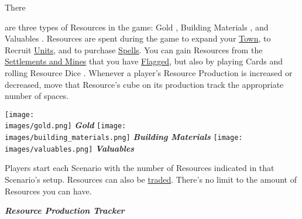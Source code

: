 
\begin{multicols}{2}

\hypertarget{Resources}{There} are three types of Resources in the game: Gold , Building Materials , and Valuables .
Resources are spent during the game to expand your \hyperlink{Town}{Town}, to Recruit \hyperlink{Units}{Units}, and to purchase \hyperlink{spells}{Spells}.
You can gain Resources from the \hyperlink{Mines}{Settlements and Mines} that you have \hyperlink{Categories}{Flagged}, but also by playing Cards and rolling Resource Dice .
Whenever a player's Resource Production is increased or decreased, move that Resource's cube on its production track the appropriate number of spaces.\par
\begin{multicols}{3}
  \centering
  \vspace*{\fill}
  \texttt{[image: \\images/gold.png]}
  \footnotesize\textcolor{darkcandyapplered}{\textit{\textbf{Gold \phantom{Materials}}}}
  \columnbreak
  \vspace*{\fill}
  \texttt{[image: \\images/building\_materials.png]}
  \footnotesize\textcolor{darkcandyapplered}{\textit{\textbf{Building Materials}}}
  \columnbreak
  \vspace*{\fill}
  \texttt{[image: \\images/valuables.png]}
  \footnotesize\textcolor{darkcandyapplered}{\textit{\textbf{Valuables \phantom{Materials}}}}
\end{multicols}
Players start each Scenario with the number of Resources indicated in that Scenario’s setup.
Resources can also be \hyperlink{Trading}{traded}.
There's no limit to the amount of Resources you can have.

\vspace*{\fill}

\columnbreak

\smallskip
\centering\footnotesize\textcolor{darkcandyapplered}{\textbf{\textit{Resource Production Tracker}}}
\bigskip


\end{multicols}
